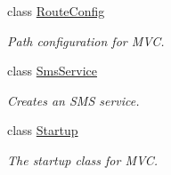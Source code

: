 \begin{DoxyCompactItemize}
class \hyperlink{class_p_c_builder_m_v_c_1_1_route_config}{Route\+Config}
\begin{DoxyCompactList}\small\item\em Path configuration for M\+VC. \end{DoxyCompactList}\item 
class \hyperlink{class_p_c_builder_m_v_c_1_1_sms_service}{Sms\+Service}
\begin{DoxyCompactList}\small\item\em Creates an S\+MS service. \end{DoxyCompactList}\item 
class \hyperlink{class_p_c_builder_m_v_c_1_1_startup}{Startup}
\begin{DoxyCompactList}\small\item\em The startup class for M\+VC. \end{DoxyCompactList}\end{DoxyCompactItemize}
